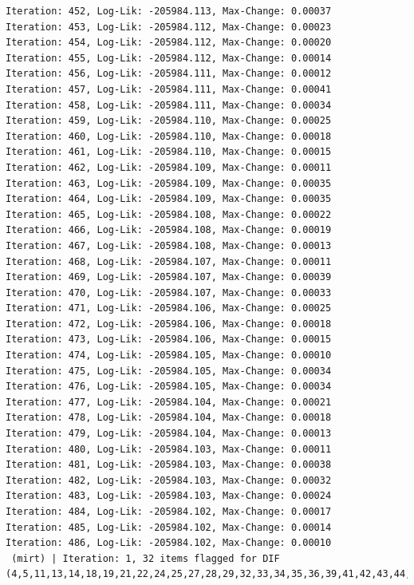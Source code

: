 \documentclass[
  letterpaper,
  DIV=11,
  numbers=noendperiod]{scrreport}
\begin{document}
\begin{verbatim}
Iteration: 452, Log-Lik: -205984.113, Max-Change: 0.00037
Iteration: 453, Log-Lik: -205984.112, Max-Change: 0.00023
Iteration: 454, Log-Lik: -205984.112, Max-Change: 0.00020
Iteration: 455, Log-Lik: -205984.112, Max-Change: 0.00014
Iteration: 456, Log-Lik: -205984.111, Max-Change: 0.00012
Iteration: 457, Log-Lik: -205984.111, Max-Change: 0.00041
Iteration: 458, Log-Lik: -205984.111, Max-Change: 0.00034
Iteration: 459, Log-Lik: -205984.110, Max-Change: 0.00025
Iteration: 460, Log-Lik: -205984.110, Max-Change: 0.00018
Iteration: 461, Log-Lik: -205984.110, Max-Change: 0.00015
Iteration: 462, Log-Lik: -205984.109, Max-Change: 0.00011
Iteration: 463, Log-Lik: -205984.109, Max-Change: 0.00035
Iteration: 464, Log-Lik: -205984.109, Max-Change: 0.00035
Iteration: 465, Log-Lik: -205984.108, Max-Change: 0.00022
Iteration: 466, Log-Lik: -205984.108, Max-Change: 0.00019
Iteration: 467, Log-Lik: -205984.108, Max-Change: 0.00013
Iteration: 468, Log-Lik: -205984.107, Max-Change: 0.00011
Iteration: 469, Log-Lik: -205984.107, Max-Change: 0.00039
Iteration: 470, Log-Lik: -205984.107, Max-Change: 0.00033
Iteration: 471, Log-Lik: -205984.106, Max-Change: 0.00025
Iteration: 472, Log-Lik: -205984.106, Max-Change: 0.00018
Iteration: 473, Log-Lik: -205984.106, Max-Change: 0.00015
Iteration: 474, Log-Lik: -205984.105, Max-Change: 0.00010
Iteration: 475, Log-Lik: -205984.105, Max-Change: 0.00034
Iteration: 476, Log-Lik: -205984.105, Max-Change: 0.00034
Iteration: 477, Log-Lik: -205984.104, Max-Change: 0.00021
Iteration: 478, Log-Lik: -205984.104, Max-Change: 0.00018
Iteration: 479, Log-Lik: -205984.104, Max-Change: 0.00013
Iteration: 480, Log-Lik: -205984.103, Max-Change: 0.00011
Iteration: 481, Log-Lik: -205984.103, Max-Change: 0.00038
Iteration: 482, Log-Lik: -205984.103, Max-Change: 0.00032
Iteration: 483, Log-Lik: -205984.103, Max-Change: 0.00024
Iteration: 484, Log-Lik: -205984.102, Max-Change: 0.00017
Iteration: 485, Log-Lik: -205984.102, Max-Change: 0.00014
Iteration: 486, Log-Lik: -205984.102, Max-Change: 0.00010
 (mirt) | Iteration: 1, 32 items flagged for DIF (4,5,11,13,14,18,19,21,22,24,25,27,28,29,32,33,34,35,36,39,41,42,43,44,46,47,48,50,51,52,54,58)


\end{verbatim}
\end{document}
